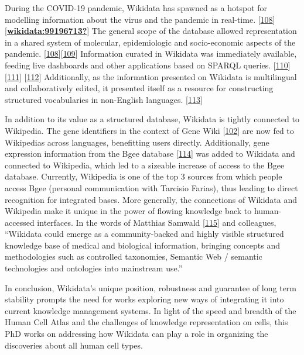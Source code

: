During the COVID-19 pandemic, Wikidata has spawned as a hotspot for modelling information about the virus and the pandemic in real-time. {[}\protect\hyperlink{ref-zH3KDqhp}{108}{]} {[}\protect\hyperlink{ref-wikidata:99196713}{\textbf{wikidata:99196713?}}{]}
The general scope of the database allowed representation in a shared system of molecular, epidemiologic and socio-economic aspects of the pandemic. {[}\protect\hyperlink{ref-zH3KDqhp}{108}{]}{[}\protect\hyperlink{ref-mPoPwN77}{109}{]}
Information curated in Wikidata was immediately available, feeding live dashboards and other applications based on SPARQL queries. {[}\protect\hyperlink{ref-3YCzr3jU}{110}{]} {[}\protect\hyperlink{ref-SkOeuFRd}{111}{]} {[}\protect\hyperlink{ref-AOVCR8mW}{112}{]}
Additionally, as the information presented on Wikidata is multilingual and collaboratively edited, it presented itself as a resource for constructing structured vocabularies in non-English languages. {[}\protect\hyperlink{ref-19wiU1LCA}{113}{]}

In addition to its value as a structured database, Wikidata is tightly connected to Wikipedia.
The gene identifiers in the context of Gene Wiki {[}\protect\hyperlink{ref-2ZhxC0dg}{102}{]} are now fed to Wikipedias across languages, benefitting users directly.
Additionally, gene expression information from the Bgee database {[}\protect\hyperlink{ref-10EWNsZCz}{114}{]} was added to Wikidata and connected to Wikipedia, which led to a sizeable increase of access to the Bgee database.
Currently, Wikipedia is one of the top 3 sources from which people access Bgee (personal communication with Tarcisio Farias), thus leading to direct recognition for integrated bases.
More generally, the connections of Wikidata and Wikipedia make it unique in the power of flowing knowledge back to human-accessed interfaces.
In the words of Matthias Samwald {[}\protect\hyperlink{ref-864Pcm4C}{115}{]} and colleagues, ``Wikidata could emerge as a community-backed and highly visible structured knowledge base of medical and biological information, bringing concepts and methodologies such as controlled taxonomies, Semantic Web / semantic technologies and ontologies into mainstream use.''

In conclusion, Wikidata's unique position, robustness and guarantee of long term stability prompts the need for works exploring new ways of integrating it into current knowledge management systems.
In light of the speed and breadth of the Human Cell Atlas and the challenges of knowledge representation on cells, this PhD works on addressing how Wikidata can play a role in organizing the discoveries about all human cell types.

